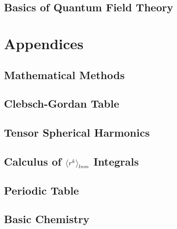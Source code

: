 \documentclass[a4paper, 11pt]{book}
\newcommand{\1}{\opr{\mathds{1}}}
\theoremstyle{definition}
\theoremstyle{remark}
\begin{document}
	\chapter{Basics of Quantum Field Theory}
	
%	
%	
%		
\part{Appendices}
\appendix
	\chapter{Mathematical Methods}
		
	\chapter{Clebsch-Gordan Table}\label{app:cgt}
		
	\chapter{Tensor Spherical Harmonics}\label{app:tsh}
		
	\chapter{Calculus of $\expval{r^k}_{lnm}$ Integrals}
		
	\chapter{Periodic Table}\label{app:E}
		
	\chapter{Basic Chemistry}
		
%		
\end{document}
